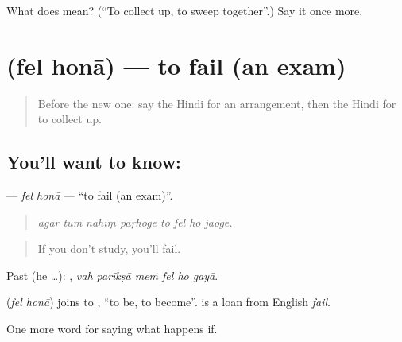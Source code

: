 \begin{tcolorbox}[breakable,colback=teal!4,colframe=teal!35!black,title={Before you move on}]
What does  mean? (\textquotedblleft{}To collect up, to sweep together\textquotedblright{}.) Say it once more.
\end{tcolorbox}
\section[\texorpdfstring{\hi{फ़ेल} \hi{होना} (fel honā)}{फ़ेल होना (fel honā)}]{  (fel honā) — to fail (an exam)}

\label{lesson:HI-C395-felhona}



\begin{quote}
Before the new one: say the Hindi for an arrangement, then the Hindi for to collect up.
\end{quote}

\subsection*{You'll want to know:  }
\textbf{ } — \emph{fel honā} — \textquotedblleft{}to fail (an exam)\textquotedblright{}.

\begin{quote}
       
\end{quote}

\begin{quote}
\emph{agar tum nahīṃ paṛhoge to fel ho jāoge.}
\end{quote}

\begin{quote}
If you don't study, you'll fail.
\end{quote}

Past (he …):      , \emph{vah parīkṣā meṁ fel ho gayā}.

\begin{cousinweb}
\textbf{ } (\emph{fel honā}) joins  to , \textquotedblleft{}to be, to become\textquotedblright{}.  is a loan from English \emph{fail}.
\end{cousinweb}

\begin{grammarlens}[title={What you've built}]
One more word for saying what happens if.
\end{grammarlens}

